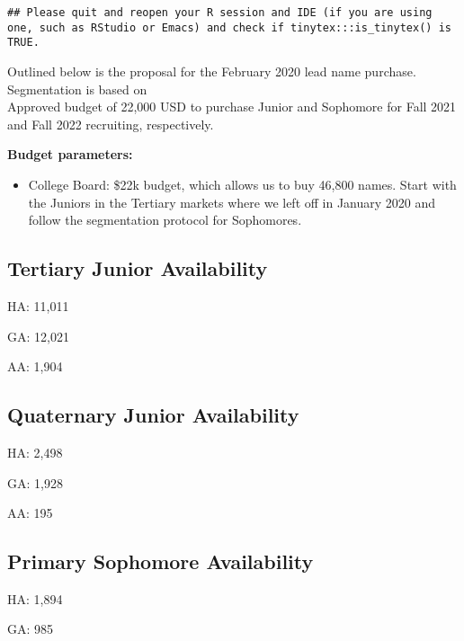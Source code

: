 \documentclass[
]{article}
\providecommand{\tightlist}{%
  \setlength{\itemsep}{0pt}\setlength{\parskip}{0pt}}
\begin{document}
\begin{verbatim}
## Please quit and reopen your R session and IDE (if you are using one, such as RStudio or Emacs) and check if tinytex:::is_tinytex() is TRUE.
\end{verbatim}

Outlined below is the proposal for the February 2020 lead name purchase.
Segmentation is based on\\
\href{https://docs.google.com/document/d/1qaOHZ7TpWGDZmaJ5zycjqpz-_aZbgO6-eaEdVxdr7uo/edit}{{}}
Approved budget of 22,000 USD to purchase Junior and Sophomore for Fall
2021 and Fall 2022 recruiting, respectively.

\textbf{Budget parameters:}

\begin{itemize}
\tightlist
\item
  College Board: \$22k budget, which allows us to buy 46,800 names.
  Start with the Juniors in the Tertiary markets where we left off in
  January 2020 and follow the segmentation protocol for Sophomores.
\end{itemize}

\hypertarget{tertiary-junior-availability}{%
\subsection{Tertiary Junior
Availability}\label{tertiary-junior-availability}}

HA: 11,011

GA: 12,021

AA: 1,904

\hypertarget{quaternary-junior-availability}{%
\subsection{Quaternary Junior
Availability}\label{quaternary-junior-availability}}

HA: 2,498

GA: 1,928

AA: 195

\hypertarget{primary-sophomore-availability}{%
\subsection{Primary Sophomore
Availability}\label{primary-sophomore-availability}}

HA: 1,894

GA: 985
\end{document}
